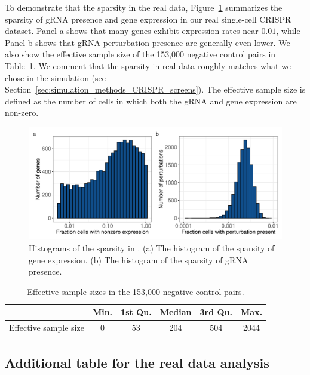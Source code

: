 \documentclass[12pt]{article}
\theoremstyle{definition}
\begin{document}
To demonstrate that the sparsity in the real data, Figure~\ref{fig:sparsity-histograms} summarizes the sparsity of gRNA presence and gene expression in our real single-cell CRISPR dataset. Panel a shows that many genes exhibit expression rates near \(0.01\), while Panel b shows that gRNA perturbation presence are generally even lower. We also show the effective sample size of the 153,000 negative control pairs in Table~\ref{tab:sparsity_level_ess}. We comment that the sparsity in real data roughly matches what we chose in the simulation (see Section~\ref{sec:simulation_methods_CRISPR_screens}). The effective sample size is defined as the number of cells in which both the gRNA and gene expression are non-zero.  

\begin{figure}[!ht]
	\centering
	\includegraphics[width=1.0\textwidth]{figures-and-tables/real-data/sparsity_histograms.pdf}
	\caption{Histograms of the sparsity in \citet{Gasperini2019a}. (a) The histogram of the sparsity of gene expression. (b) The histogram of the sparsity of gRNA presence.}
	\label{fig:sparsity-histograms}
\end{figure}

  
\begin{table}[h!]
	\centering
	\begin{tabular}[t]{lccccc}
	\toprule
	  & Min. & 1st Qu. & Median & 3rd Qu. & Max.\\
	\midrule
	Effective sample size & 0   &   53   &  204  &   504  & 2044 \\
	\bottomrule
	\end{tabular}
	\caption{Effective sample sizes in the 153,000 negative control pairs.}
	\label{tab:sparsity_level_ess}
\end{table}


\subsection{Additional table for the real data analysis}\label{sec:additional_table_realdata}
\end{document}
